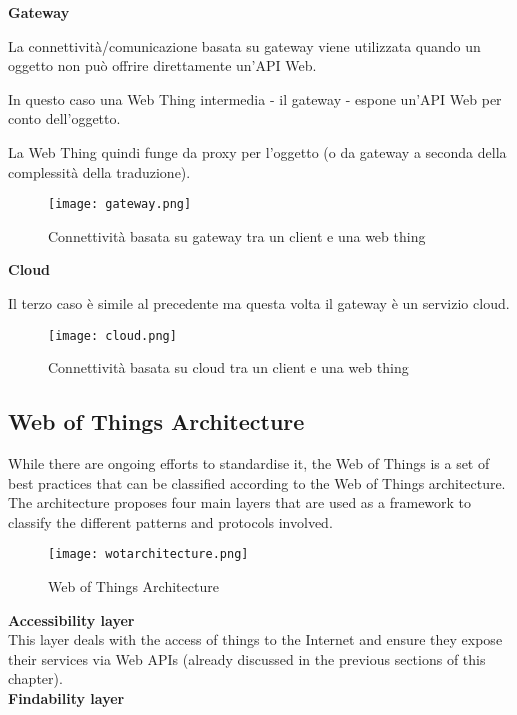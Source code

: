 \textbf{Gateway}

La connettività/comunicazione basata su gateway viene utilizzata quando un oggetto
non può offrire direttamente un'API Web.

In questo caso una Web Thing intermedia - il gateway - espone un'API Web
per conto dell'oggetto.

La Web Thing quindi funge da proxy per l'oggetto (o da gateway a seconda della
complessità della traduzione).

\begin{figure}[H]
  \centering
  \texttt{[image: gateway.png]}
  \caption{Connettività basata su gateway tra un client e una web thing}
  \label{fig:gateway}
\end{figure}

\textbf{Cloud}

Il terzo caso è simile al precedente ma questa volta il gateway è un servizio
cloud.

\begin{figure}[H]
  \centering
  \texttt{[image: cloud.png]}
  \caption{Connettività basata su cloud tra un client e una web thing}
  \label{fig:cloud}
\end{figure}

\subsection{Web of Things Architecture}

While there are ongoing efforts to standardise it, the Web of Things is a set 
of best practices that can be classified according to the Web of Things
architecture.
The architecture proposes four main layers that are used as a framework to
classify the different patterns and protocols involved.

\begin{figure}[H]
  \centering
  \texttt{[image: wotarchitecture.png]}
  \caption{Web of Things Architecture}
  \label{fig:wotarchitecture}
\end{figure}

\textbf{Accessibility layer}\\

This layer deals with the access of things to the
Internet and ensure they expose their services via Web APIs
(already discussed in the previous sections of this chapter).\\

\textbf{Findability layer}\\

